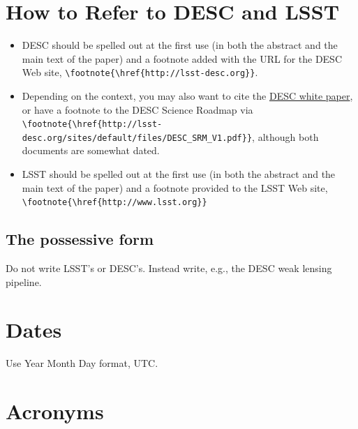 \documentclass[letterpaper,11pt]{article}
\begin{document}
\section{How to Refer to DESC and LSST} 

\begin{itemize}
\item{DESC should be spelled out at the first use (in both the abstract and the main text of the paper) and a footnote added with the URL for the DESC Web site, \verb|\footnote{\href{http://lsst-desc.org}}|.}
  
\item{Depending on the context, you may also want to cite the \href{http://adsabs.harvard.edu/abs/2012arXiv1211.0310L}{DESC white paper}, or have a footnote to the DESC Science Roadmap via \verb|\footnote{\href{http://lsst-desc.org/sites/default/files/DESC_SRM_V1.pdf}}|, although both documents are somewhat dated.}

\item{LSST should be spelled out at the first use (in both the abstract and the main text of the paper) and a footnote provided to the LSST Web site, \verb|\footnote{\href{http://www.lsst.org}}|}

\end{itemize}




\subsection{The possessive form}

Do not write LSST's or DESC's.  Instead write, e.g., the DESC weak lensing pipeline.

\section{Dates}

Use Year Month Day format, UTC.


\section{Acronyms}
\end{document}
